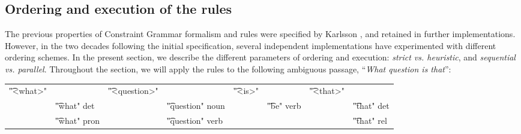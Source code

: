 \subsection{Ordering and execution of the rules}\label{sec:ordering}

The previous properties of Constraint Grammar formalism and rules were
specified by Karlsson \cite{karlsson1995constraint}, and retained in further
implementations.  However, in the two decades following the initial
specification, several independent implementations have experimented
with different ordering schemes. In the present section, we describe
the different parameters of ordering and execution: \emph{strict
  vs. heuristic}, and \emph{sequential vs. parallel}.  Throughout the
section, we will apply the rules to the following ambiguous passage,
``{\em What question is that}'':

\begin{tabular}{p{0.6cm} l  p{0.6cm} l p{0.6cm} l p{0.6cm} l}
\t{"<what>"}     &                      &  \t{"<question>"}        &  & \t{"<is>"}         & & \t{"<that>"} \\
                 & \t{"what" det}       & &      \t{"question" noun}  &  &    \t{"be" verb}  & &    \t{"that" det}  \\
                 & \t{"what" pron}      & &      \t{"question" verb}  &  &                   & &    \t{"that" rel} \\
\end{tabular}


\def\satcgMax{SAT-CG\textsubscript{Max}}
\def\satcgOrd{SAT-CG\textsubscript{Ord}}
\def\noncg#1{{\em \color{gray} #1}}


